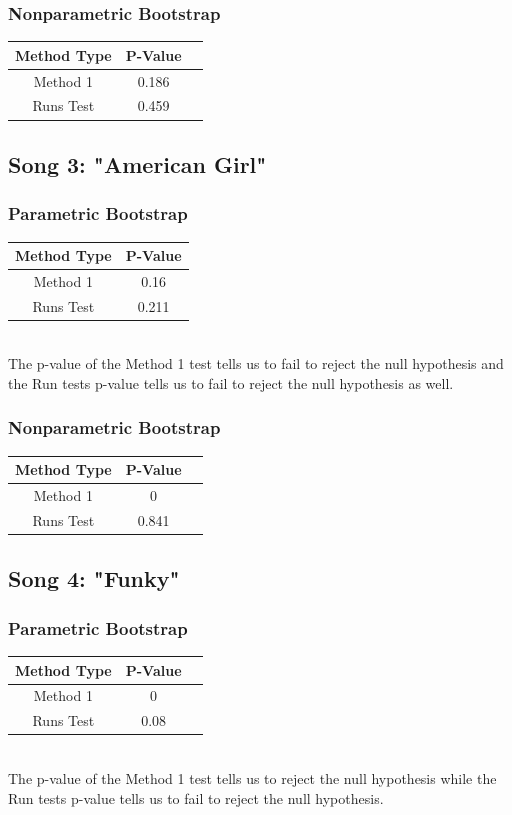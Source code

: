 \documentclass[12pt, letterpaper]{article}
\begin{document}
\subsubsection{Nonparametric Bootstrap}
\begin{tabular}{|c|c|c|}
\hline
\textbf{Method Type} & P-Value \\
\hline
Method 1 & 0.186  \\
\hline
Runs Test & 0.459 \\ 
\hline
\end{tabular}

\subsection{Song 3: "American Girl"}
\subsubsection{Parametric Bootstrap}
\begin{tabular}{|c|c|}
\hline
\textbf{Method Type} & P-Value \\
\hline
Method 1 & 0.16 \\
\hline
Runs Test & 0.211 \\ 
\hline 
\end{tabular} \\
The p-value of the Method 1 test tells us to fail to reject the null hypothesis and the Run tests p-value tells us to fail to reject the null hypothesis as well.

\subsubsection{Nonparametric Bootstrap}
\begin{tabular}{|c|c|c|}
\hline
\textbf{Method Type} & P-Value \\
\hline
Method 1 & 0  \\
\hline
Runs Test & 0.841 \\ 
\hline
\end{tabular}

\subsection{Song 4: "Funky"}
\subsubsection{Parametric Bootstrap}
\begin{tabular}{|c|c|c|}
\hline
\textbf{Method Type} & P-Value \\
\hline
Method 1 & 0 \\
\hline
Runs Test & 0.08  \\ 
\hline
\end{tabular} \\
The p-value of the Method 1 test tells us to reject the null hypothesis while the Run tests p-value tells us to fail to reject the null hypothesis.
\end{document}
